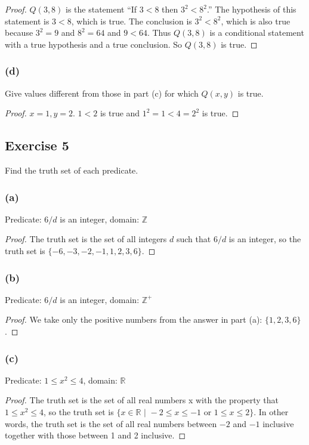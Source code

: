 \documentclass[14pt]{extarticle}
\newcommand{\R}{\mathbb{R}}
\newcommand{\Z}{\mathbb{Z}}
\begin{document}
\begin{proof}
$Q(3, 8)$ is the statement “If $3 < 8$ then $3^2 < 8^2$.”
The hypothesis of this statement is $3 < 8$, which is true. The conclusion is $3^2 < 8^2$, which is also true because $3^2 = 9$ and $8^2 = 64$ and $9 < 64$. Thus $Q(3, 8)$ is a conditional statement with a true hypothesis and a true conclusion. So $Q(3, 8)$ is true.
\end{proof}

\subsubsection{(d)}
Give values different from those in part (c) for which $Q(x, y)$ is true.

\begin{proof}
$x = 1, y = 2$. $1 < 2$ is true and $1^2 = 1 < 4 = 2^2$ is true.
\end{proof}

\subsection{Exercise 5}
Find the truth set of each predicate.

\subsubsection{(a)}
Predicate: $6/d$ is an integer, domain: $\Z$

\begin{proof}
The truth set is the set of all integers $d$ such that $6/d$ is an integer, so the truth set is $\{-6, -3, -2, -1, 1, 2, 3, 6\}$.

\end{proof}

\subsubsection{(b)}
Predicate: $6/d$ is an integer, domain: $\Z^+$

\begin{proof}
We take only the positive numbers from the answer in part (a): $\{1, 2, 3, 6\}$.
\end{proof}

\subsubsection{(c)}
Predicate: $1 \leq x^2 \leq 4$, domain: $\R$

\begin{proof}
The truth set is the set of all real numbers x with the property that $1 \leq x^2 \leq 4$, so the truth set is $\{x \in \R \,\, | \,\, -2 \leq x \leq -1 \text{ or } 1 \leq x \leq 2\}$. In other words, the truth set is the set of all real numbers between $-2$ and $-1$ inclusive together with those between 1 and 2 inclusive.
\end{proof}
\end{document}
